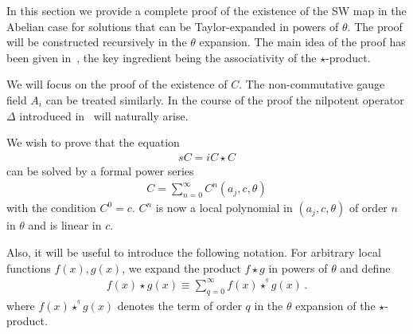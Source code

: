 \documentclass[a4paper,12pt]{article}
\newcommand{\stargr}[1]{\star^{\!\!\!^#1}}
\begin{document}
In this section we provide a complete proof of the existence
 of the SW map in the Abelian case for solutions
 that can be Taylor-expanded in  powers of $\theta$.
The proof will be constructed recursively in the $\theta$ expansion.
The main idea of the proof has been given in~\cite{stora},
 the key ingredient being the associativity of the $\star$-product.

We will focus on the proof of the existence of $C$. The non-commutative
 gauge field $A_i$ can be treated  similarly.
In the course of the proof the nilpotent operator $\Delta$ introduced 
 in~\cite{Brace:2001fj} will naturally arise. 

We wish to prove that the equation
%
\begin{eqnarray}
s C = i C \star C
\label{e37}
\end{eqnarray}
%
can be solved by a formal power series
%
\begin{eqnarray}
C = \sum_{n=0}^\infty C^n(a_j,c,\theta)
\label{e38}
\end{eqnarray}
%
with the condition $C^0 = c$. $C^n$ is now a local polynomial 
 in $(a_j,c,\theta)$ of order $n$ in $\theta$ and is linear in $c$.

Also, it will be useful to introduce the following notation.
For arbitrary local functions $f(x),g(x)$, we expand the product $f \star g$
 in powers of $\theta$ and define
%
\begin{eqnarray}
f(x) \star g(x) \equiv \sum_{q=0}^{\infty} f(x) \stargr{q}  g(x) \, .
\label{e39}
\end{eqnarray}
%
where $ f(x) \stargr{q}  g(x)$ denotes the term of order $q$ in 
the $\theta$ expansion of the $\star$-product.
\end{document}
